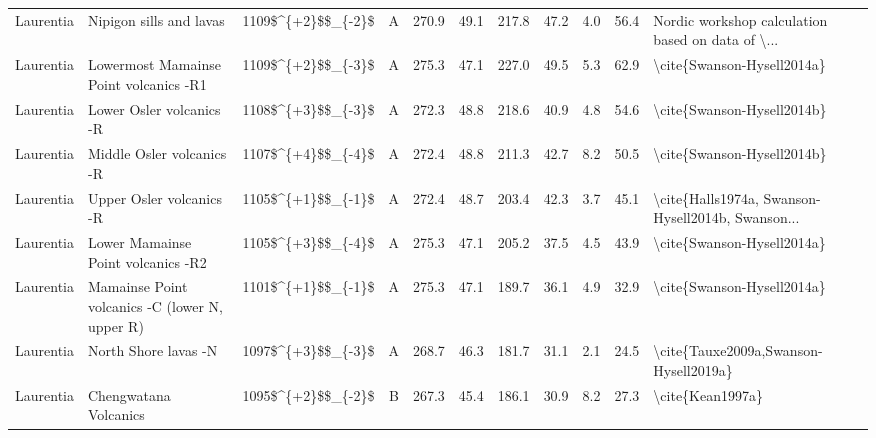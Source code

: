 \begin{longtable}{p{1 in}p{1 in}rrrrrrrr}
                     Laurentia &                          Nipigon sills and lavas &     1109\$\textasciicircum \{+2\}\$\$\_\{-2\}\$ &      A &     270.9 &      49.1 & 217.8 &  47.2 &       4.0 &        56.4 &  Nordic workshop calculation based on data of \textbackslash ... \\
                     Laurentia &           Lowermost Mamainse Point volcanics -R1 &     1109\$\textasciicircum \{+2\}\$\$\_\{-3\}\$ &      A &     275.3 &      47.1 & 227.0 &  49.5 &       5.3 &        62.9 &                         \textbackslash cite\{Swanson-Hysell2014a\} \\
                     Laurentia &                         Lower Osler volcanics -R &     1108\$\textasciicircum \{+3\}\$\$\_\{-3\}\$ &      A &     272.3 &      48.8 & 218.6 &  40.9 &       4.8 &        54.6 &                         \textbackslash cite\{Swanson-Hysell2014b\} \\
                     Laurentia &                        Middle Osler volcanics -R &     1107\$\textasciicircum \{+4\}\$\$\_\{-4\}\$ &      A &     272.4 &      48.8 & 211.3 &  42.7 &       8.2 &        50.5 &                         \textbackslash cite\{Swanson-Hysell2014b\} \\
                     Laurentia &                         Upper Osler volcanics -R &     1105\$\textasciicircum \{+1\}\$\$\_\{-1\}\$ &      A &     272.4 &      48.7 & 203.4 &  42.3 &       3.7 &        45.1 &  \textbackslash cite\{Halls1974a, Swanson-Hysell2014b, Swanson... \\
                     Laurentia &               Lower Mamainse Point volcanics -R2 &     1105\$\textasciicircum \{+3\}\$\$\_\{-4\}\$ &      A &     275.3 &      47.1 & 205.2 &  37.5 &       4.5 &        43.9 &                         \textbackslash cite\{Swanson-Hysell2014a\} \\
                     Laurentia &   Mamainse Point volcanics -C (lower N, upper R) &     1101\$\textasciicircum \{+1\}\$\$\_\{-1\}\$ &      A &     275.3 &      47.1 & 189.7 &  36.1 &       4.9 &        32.9 &                         \textbackslash cite\{Swanson-Hysell2014a\} \\
                     Laurentia &                             North Shore lavas -N &     1097\$\textasciicircum \{+3\}\$\$\_\{-3\}\$ &      A &     268.7 &      46.3 & 181.7 &  31.1 &       2.1 &        24.5 &              \textbackslash cite\{Tauxe2009a,Swanson-Hysell2019a\} \\
                     Laurentia &                            Chengwatana Volcanics &     1095\$\textasciicircum \{+2\}\$\$\_\{-2\}\$ &      B &     267.3 &      45.4 & 186.1 &  30.9 &       8.2 &        27.3 &                                   \textbackslash cite\{Kean1997a\} \\

\end{longtable}
